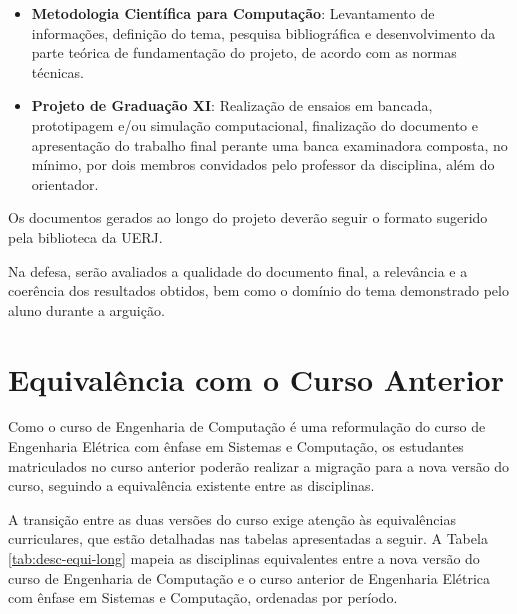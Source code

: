 \begin{itemize}
    \item \textbf{Metodologia Científica para Computação}: Levantamento de informações, definição do tema, pesquisa bibliográfica e desenvolvimento da parte teórica de fundamentação do projeto, de acordo com as normas técnicas.
    \item \textbf{Projeto de Graduação XI}: Realização de ensaios em bancada, prototipagem e/ou simulação computacional, finalização do documento e apresentação do trabalho final perante uma banca examinadora composta, no mínimo, por dois membros convidados pelo professor da disciplina, além do orientador.
\end{itemize}

Os documentos gerados ao longo do projeto deverão seguir o formato sugerido pela biblioteca da UERJ.

Na defesa, serão avaliados a qualidade do documento final, a relevância e a coerência dos resultados obtidos, bem como o domínio do tema demonstrado pelo aluno durante a arguição.



\section{Equivalência com o Curso Anterior}

Como o curso de Engenharia de Computação é uma reformulação do curso de Engenharia Elétrica com ênfase em Sistemas e Computação, os estudantes matriculados no curso anterior poderão realizar a migração para a nova versão do curso, seguindo a equivalência existente entre as disciplinas.

A transição entre as duas versões do curso exige atenção às equivalências curriculares, que estão detalhadas nas tabelas apresentadas a seguir. A Tabela \ref{tab:desc-equi-long}  mapeia as disciplinas equivalentes entre a nova versão do curso de Engenharia de Computação e o curso anterior de Engenharia Elétrica com ênfase em Sistemas e Computação, ordenadas por período.

